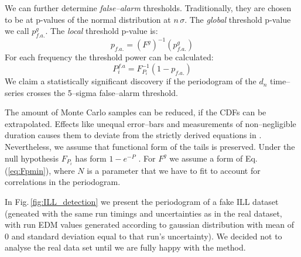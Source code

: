 We can further determine \emph{false--alarm} thresholds. Traditionally, they are chosen to be at p-values of the normal distribution at $n \,\sigma$. The \emph{global} threshold p-value we call $p^g_{f.a.}$. The \emph{local} threshold p-value is:
\begin{equation}
  p_{f.a.} = \left( F^g \right)^{-1}(p^g_{f.a.})
\end{equation}
For each frequency the threshold power can be calculated:
\begin{equation}
  P^{f.a}_i = F_{P_i}^{-1}(1 - p_{f.a.})
\end{equation}
We claim a statistically significant discovery if the periodogram of the $d_n$ time--series crosses the 5--sigma false--alarm threshold.

The amount of Monte Carlo samples can be reduced, if the CDFs can be extrapolated. Effects like unequal error--bars and measurements of non--negligible duration causes them to deviate from the strictly derived equations in \cite{Scargle1982}. Nevertheless, we assume that functional form of the tails is preserved. Under the null hypothesis $F_{P_i}$ has form $1 - e^{-P}$ \cite{Scargle1982}. For $F^g$ we assume a form of Eq.\,(\ref{eq:Fpmin}), where $N$ is a parameter that we have to fit to account for correlations in the periodogram.

In Fig.\,\ref{fig:ILL_detection} we present the periodogram of a fake ILL dataset (geneated with the same run timings and uncertainties as in the real dataset, with run EDM values generated according to gaussian distribution with mean of $0$ and standard deviation equal to that run's uncertainty). We decided not to analyse the real data set until we are fully happy with the method.

